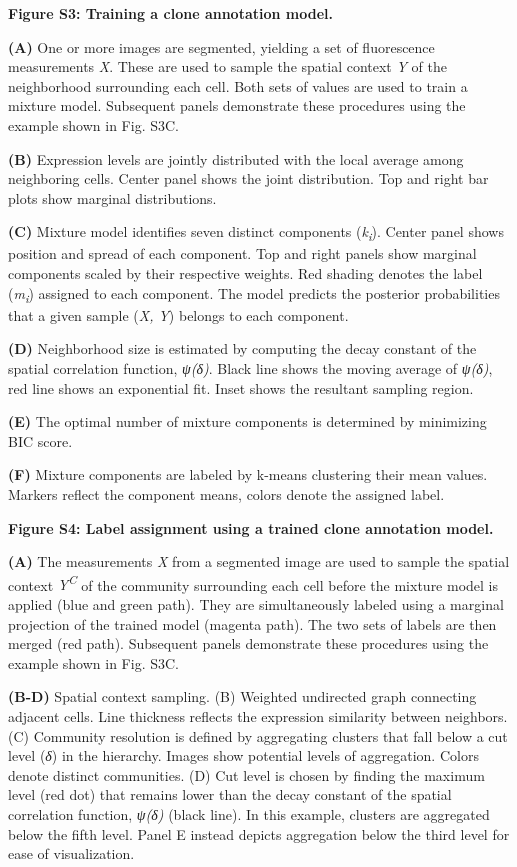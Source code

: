 \textbf{Figure S3: Training a clone annotation model.}

\textbf{(A)} One or more images are segmented, yielding a set of fluorescence measurements \emph{X}. These are used to sample the spatial context \emph{Y} of the neighborhood surrounding each cell. Both sets of values are used to train a mixture model. Subsequent panels demonstrate these procedures using the example shown in Fig. S3C.

\textbf{(B)} Expression levels are jointly distributed with the local average among neighboring cells. Center panel shows the joint distribution. Top and right bar plots show marginal distributions.

\textbf{(C)} Mixture model identifies seven distinct components (\emph{k\textsubscript{i}}). Center panel shows position and spread of each component. Top and right panels show marginal components scaled by their respective weights. Red shading denotes the label (\emph{m\textsubscript{i}}) assigned to each component. The model predicts the posterior probabilities that a given sample (\emph{X, Y}) belongs to each component.

\textbf{(D)} Neighborhood size is estimated by computing the decay constant of the spatial correlation function, \emph{ψ(δ)}. Black line shows the moving average of \emph{ψ(δ)}, red line shows an exponential fit. Inset shows the resultant sampling region.

\textbf{(E)} The optimal number of mixture components is determined by minimizing BIC score.

\textbf{(F)} Mixture components are labeled by k-means clustering their mean values. Markers reflect the component means, colors denote the assigned label.

\textbf{Figure S4: Label assignment using a trained clone annotation model.}

\textbf{(A)} The measurements \emph{X} from a segmented image are used to sample the spatial context \emph{Y\textsuperscript{C}} of the community surrounding each cell before the mixture model is applied (blue and green path). They are simultaneously labeled using a marginal projection of the trained model (magenta path). The two sets of labels are then merged (red path). Subsequent panels demonstrate these procedures using the example shown in Fig. S3C.

\textbf{(B-D)} Spatial context sampling. (B) Weighted undirected graph connecting adjacent cells. Line thickness reflects the expression similarity between neighbors. (C) Community resolution is defined by aggregating clusters that fall below a cut level (\emph{δ}) in the hierarchy. Images show potential levels of aggregation. Colors denote distinct communities. (D) Cut level is chosen by finding the maximum level (red dot) that remains lower than the decay constant of the spatial correlation function, \emph{ψ(δ)} (black line). In this example, clusters are aggregated below the fifth level. Panel E instead depicts aggregation below the third level for ease of visualization.

